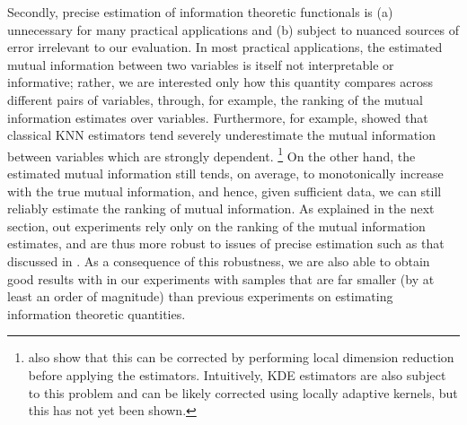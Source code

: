 \documentclass{article} %
\begin{document}
Secondly, precise estimation of information theoretic functionals is (a)
unnecessary for many practical applications and (b) subject to nuanced sources
of error irrelevant to our evaluation. In most practical applications, the
estimated mutual information between two variables is itself not interpretable
or informative; rather, we are interested only how this quantity compares
across different pairs of variables, through, for example, the ranking of the
mutual information estimates over variables. Furthermore, for example,
\citet{gao2014stronglyDependent} showed that classical KNN estimators tend
severely underestimate the mutual information between variables which are
strongly dependent.
\footnote{\citet{gao2014stronglyDependent} also show that this can be corrected
by performing local dimension reduction before applying the estimators.
Intuitively, KDE estimators are also subject to this problem and can be likely
corrected using locally adaptive kernels, but this has not yet been shown.}
On the other hand, the estimated mutual information still tends, on average, to
monotonically increase with the true mutual information, and hence, given
sufficient data, we can still reliably estimate the ranking of mutual
information. As explained in the next section, out experiments rely only on the
ranking of the mutual information estimates, and are thus more robust to issues
of precise estimation such as that discussed in
\citet{gao2014stronglyDependent}. As a consequence of this robustness, we are
also able to obtain good results with in our experiments with samples that are
far smaller (by at least an order of magnitude) than previous experiments on
estimating information theoretic quantities.
\end{document}
